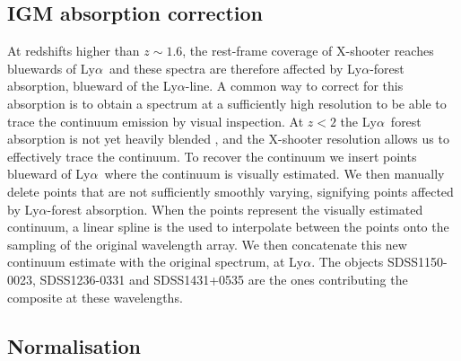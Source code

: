 \documentclass{aa}    %
\newcommand{\sectlabel}[1]{\label{sect:#1}}
\newcommand{\lya}{Ly$\alpha$}
\begin{document}
\subsection{IGM absorption correction} \sectlabel{igm}
At redshifts higher than $z\sim1.6$, the rest-frame coverage of X-shooter
reaches bluewards of \lya~and these spectra are therefore affected by
\lya-forest absorption, blueward of the \lya-line. A common way to correct for
this absorption is to obtain a spectrum at a sufficiently high resolution to be
able to trace the continuum emission by visual inspection. At $z < 2 $ the
\lya~forest absorption is not yet heavily blended \citep{DallAglio2008}, and the
X-shooter resolution allows us to effectively trace the continuum. To recover
the continuum we insert points blueward of \lya~where the continuum is visually estimated.
We then manually delete points that are not sufficiently smoothly
varying, signifying points affected by \lya-forest absorption. 
When the points represent the visually estimated continuum, a linear spline is the used to
interpolate between the points onto the sampling of the original wavelength
array. We then concatenate this new continuum estimate with the original
spectrum, at \lya. The objects SDSS1150-0023, SDSS1236-0331 and SDSS1431+0535
are the ones contributing the composite at these wavelengths. 


\subsection{Normalisation}  \sectlabel{norm}
\end{document}
